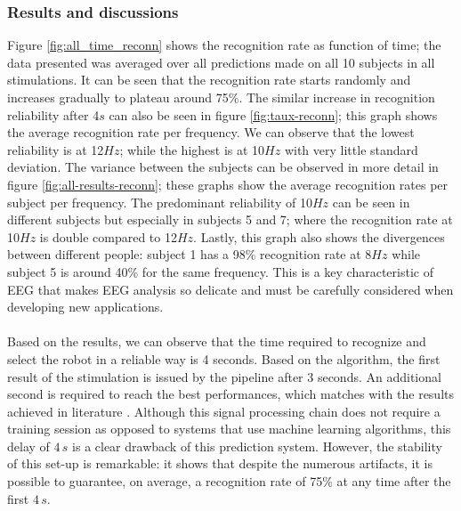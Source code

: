 \documentclass{svmult}
\begin{document}
\subsubsection{Results and discussions}
Figure \ref{fig:all_time_reconn} shows the recognition rate as function of time; the data presented was averaged over all predictions made on all 10 subjects in all stimulations. It can be seen that the recognition rate starts randomly and increases gradually to plateau around 75\%. The similar increase in recognition reliability after 4$s$ can also be seen in figure \ref{fig:taux-reconn}; this graph shows the average recognition rate per frequency. We can observe that the lowest reliability is at 12$Hz$; while the highest is at 10$Hz$ with very little standard deviation. The variance between the subjects can be observed in more detail in figure \ref{fig:all-results-reconn}; these graphs show the average recognition rates per subject per frequency. The predominant reliability of 10$Hz$ can be seen in different subjects but especially in subjects 5 and 7; where the recognition rate at 10$Hz$ is double compared to 12$Hz$. Lastly, this graph also shows the divergences between different people: subject 1 has a 98\% recognition rate at 8$Hz$ while subject 5 is around 40\% for the same frequency. This is a key characteristic of EEG that makes EEG analysis so delicate and must be carefully considered when developing new applications.\\
\\
Based on the results, we can observe that the time required to recognize and select the robot in a reliable way is 4 seconds. 
Based on the algorithm, the first result of the stimulation is issued by the pipeline after 3 seconds. 
An additional second is required to reach the best performances, which matches with the results achieved in literature \cite{car, SSVEPfiability, jian2014improving, paper4}. 
Although this signal processing chain does not require a training session as opposed to systems that use machine learning algorithms, this delay of $4\,s$ is a clear drawback of this prediction system. 
However, the stability of this set-up is remarkable: it shows that despite the numerous artifacts, it is possible to guarantee, on average, a recognition rate of 75\% at any time after the first $4\,s$. 
\end{document}
